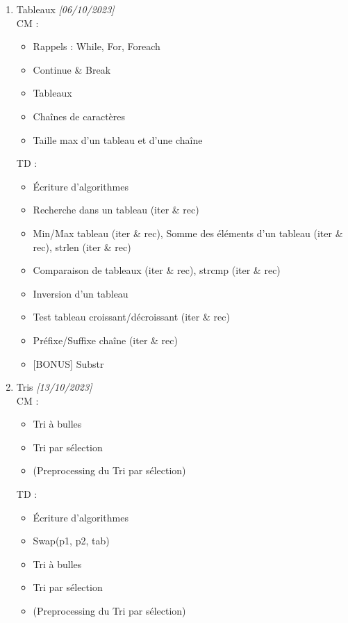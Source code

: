 \documentclass[11pt,a4paper]{article}
\begin{document}
\begin{enumerate}
\medskip

\clearpage

\item Tableaux \textit{[06/10/2023]}\\
  CM :
  \begin{itemize}
  \item Rappels : While, For, Foreach
  \item Continue \& Break
  \item Tableaux
  \item Chaînes de caractères
  \item Taille max d'un tableau et d'une chaîne
  \end{itemize}
  TD :
  \begin{itemize}
  \item \'Ecriture d'algorithmes
  \item Recherche dans un tableau (iter \& rec)
  \item Min/Max tableau (iter \& rec), Somme des éléments d'un tableau (iter \& rec), strlen (iter \& rec)
  \item Comparaison de tableaux (iter \& rec), strcmp (iter \& rec)
  \item Inversion d'un tableau
  \item Test tableau croissant/décroissant (iter \& rec)
  \item Préfixe/Suffixe chaîne (iter \& rec)
  \item {} [BONUS] Substr
  \end{itemize}

\medskip

\item Tris \textit{[13/10/2023]}\\
  CM :
  \begin{itemize}
  \item Tri à bulles
  \item Tri par sélection
  \item (Preprocessing du Tri par sélection)
  \end{itemize}
  TD :
  \begin{itemize}
  \item \'Ecriture d'algorithmes
  \item Swap(p1, p2, tab)
  \item Tri à bulles
  \item Tri par sélection
  \item (Preprocessing du Tri par sélection)
  \end{itemize}


\end{enumerate}
\end{document}
